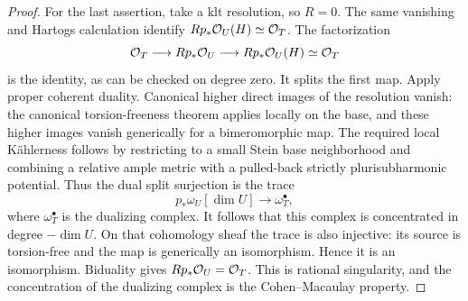 \begin{proof}
For the last assertion, take a klt resolution, so \(R=0\).  The same
vanishing and Hartogs calculation identify
\(Rp_*\mathcal O_U(H)\simeq\mathcal O_T\).  The factorization
\[
 \mathcal O_T\longrightarrow Rp_*\mathcal O_U\longrightarrow Rp_*\mathcal O_U(H)\simeq\mathcal O_T
\]
is the identity, as can be checked on degree zero.  It splits the first
map.  Apply proper coherent duality.  Canonical higher direct images of
the resolution vanish: the canonical torsion-freeness theorem
\cite[Theorem~2.9 and Proposition~2.11]{Fujino2023AnalyticVanishing}
applies locally on the base, and these higher images vanish generically
for a bimeromorphic map.  The required local K\"ahlerness follows by
restricting to a small Stein base neighborhood and combining a relative
ample metric with a pulled-back strictly plurisubharmonic potential.
Thus the dual split surjection is the trace
\[
 p_*\omega_U[\dim U]\longrightarrow\omega_T^\bullet,
\]
where \(\omega_T^\bullet\) is the dualizing complex.  It follows that this
complex is concentrated in degree \(-\dim U\).  On that cohomology sheaf
the trace is also injective: its source is torsion-free and the map is
generically an isomorphism.  Hence it is an isomorphism.  Biduality gives
\(Rp_*\mathcal O_U=\mathcal O_T\).  This is rational singularity, and the concentration
of the dualizing complex is the Cohen--Macaulay property.
\end{proof}
